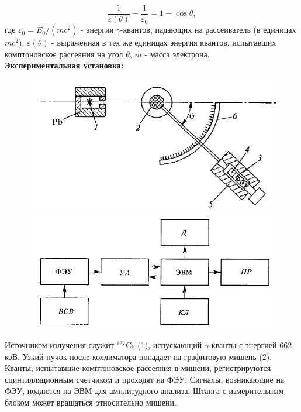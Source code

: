 \documentclass[a4paper, 12pt]{article}%
\begin{document}
\[\frac{1}{\varepsilon(\theta)} - \frac{1}{\varepsilon_0} = 1 - \cos \theta,\]
где $\varepsilon_0 = E_0/(mc^2)$ - энергия $\gamma$-квантов, падающих на рассеиватель (в единицах $mc^2$),  $\varepsilon(\theta)$ - выраженная в тех же единицах энергия квантов, испытавших комптоновское рассеяния на угол $\theta$, $m$ - масса электрона.\\

\textbf{Экспериментальная установка:}\\\par

\begin{figure}[h]
	\begin{center}
		\begin{minipage}[h]{0.48\linewidth}
			\includegraphics[width=1\linewidth]{Схема1.PNG}
		\end{minipage}
		\hfill 
		\begin{minipage}[h]{0.48\linewidth}
			\includegraphics[width=1\linewidth]{Схема2.PNG}
		\end{minipage}
	\end{center}
\end{figure}

Источником излучения служит $^{137}$Cs (1),  испускающий  $\gamma$-кванты с энергией 662 кэВ.  Узкий пучок после коллиматора попадает на графитовую мишень (2). Кванты,  испытавшие комптоновское рассеяния в мишени,  регистрируются сцинтилляционным счетчиком и проходят на ФЭУ.  Сигналы,  возникающие на ФЭУ, подаются на ЭВМ для амплитудного анализа.  Штанга с измерительным блоком может вращаться относительно мишени.\\
\end{document}
